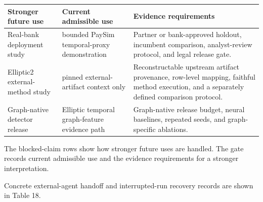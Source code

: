 \documentclass[11pt]{article}
\begin{document}
\begin{center}
\begin{minipage}{\linewidth}
\small
\setlength{\tabcolsep}{3pt}
\renewcommand{\arraystretch}{1.16}
\begin{tabularx}{\linewidth}{@{}>{\raggedright\arraybackslash}X >{\raggedright\arraybackslash}X >{\raggedright\arraybackslash}X@{}}
\toprule
Stronger future use & Current admissible use & Evidence requirements \\
\midrule
Real-bank deployment study & bounded PaySim temporal-proxy demonstration & Partner or bank-approved holdout, incumbent comparison, analyst-review protocol, and legal release gate. \\
\mbox{Elliptic2} external-method study & pinned external-artifact context only & Reconstructable upstream artifact provenance, row-level mapping, faithful method execution, and a separately defined comparison protocol. \\
Graph-native detector release & Elliptic temporal graph-feature evidence path & Graph-native release budget, neural baselines, repeated seeds, and graph-specific ablations. \\
\bottomrule
\end{tabularx}
\end{minipage}
\end{center}


The blocked-claim rows show how stronger future uses are handled. The gate records current admissible use and the evidence requirements for a stronger interpretation.

Concrete external-agent handoff and interrupted-run recovery records are shown in Table 18.
\end{document}
